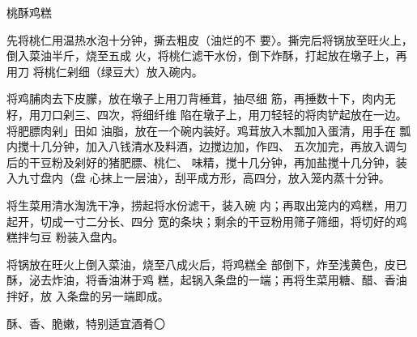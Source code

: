 \begin{recipe}{桃酥鸡糕}

\ingredients


\cooking

\step 先将桃仁用温热水泡十分钟，撕去粗皮（油烂的不 要〉。撕完后将锅放至旺火上，倒入菜油半斤，烧至五成 火，将桃仁滤干水份，倒下炸酥，打起放在墩子上，再用刀 将桃仁剁细（绿豆大）放入碗内。

将鸡脯肉去下皮朦，放在墩子上用刀背棰茸，抽尽细 筋，再捶数十下，肉内无籽，用刀口剁三、四次，将细纤维 陷在墩子上，用刀轻轻的将肉铲起放在一边。将肥膘肉剁」田如 油脂，放在一个碗内装好。鸡茸放入木瓢加入蛋清，用手在 瓢内搅十几分钟，加入八钱清水及料酒，边搅边加，作四、 五次加完，再放入调匀后的干豆粉及剁好的猪肥膘、桃仁、 味精，搅十几分钟，再加盐搅十几分钟，装入九寸盘内（盘 心抹上一层油〉，刮平成方形，高四分，放入笼内蒸十分钟。

\step 将生菜用清水淘洗干净，捞起将水份滤干，装入碗 内；再取出笼内的鸡糕，用刀起开，切成一寸二分长、四分 宽的条块；剩余的干豆粉用筛子筛细，将切好的鸡糕拌匀豆 粉装入盘内。

将锅放在旺火上倒入菜油，烧至八成火后，将鸡糕全 部倒下，炸至浅黄色，皮已酥，泌去炸油，将香油淋于鸡 糕，起锅入条盘的一端；再将生菜用糖、醋、香油拌好，放 入条盘的另一端即成。

\notes

酥、香、脆嫩，特别适宜酒肴〇

\end{recipe}

